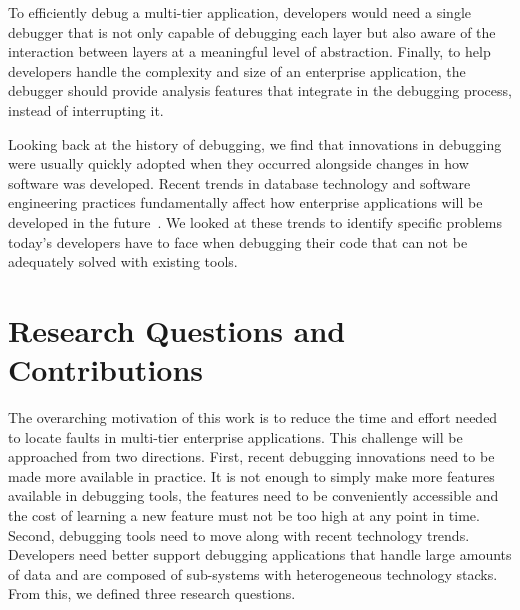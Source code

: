 To efficiently debug a multi-tier application, developers would need a single debugger that is not only capable of debugging each layer but also aware of the interaction between layers at a meaningful level of abstraction.
Finally, to help developers handle the complexity and size of an enterprise application, the debugger should provide analysis features that integrate in the debugging process, instead of interrupting it.

Looking back at the history of debugging, we find that innovations in debugging were usually quickly adopted when they occurred alongside changes in how software was developed.
Recent trends in database technology and software engineering practices fundamentally affect how enterprise applications will be developed in the future~\cite{plattner15:the_in-memory_revolution_how}.
We looked at these trends to identify specific problems today's developers have to face when debugging their code that can not be adequately solved with existing tools. 

\section{Research Questions and Contributions} %

The overarching motivation of this work is to reduce the time and effort needed to locate faults in multi-tier enterprise applications. %
This challenge will be approached from two directions.
First, recent debugging innovations need to be made more available in practice.
It is not enough to simply make more features available in debugging tools, the features need to be conveniently accessible and the cost of learning a new feature must not be too high at any point in time.
Second, debugging tools need to move along with recent technology trends.
Developers need better support debugging applications that handle large amounts of data and are composed of sub-systems with heterogeneous technology stacks.
From this, we defined three research questions.

\newcommand{\RQ}[1]{\subsection*{#1}}

